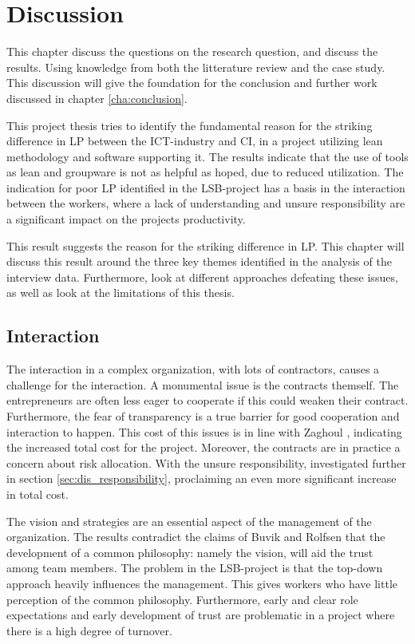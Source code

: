 
\chapter{Discussion} \label{cha:discussion}
This chapter discuss the questions on the research question, and discuss the results. Using knowledge from both the litterature review and the case study. This discussion will give the foundation for the conclusion and further work discussed in chapter \ref{cha:conclusion}. 

This project thesis tries to identify the fundamental reason for the striking difference in LP between the ICT-industry and CI, in a project utilizing lean methodology and software supporting it. The results indicate that the use of tools as lean and groupware is not as helpful as hoped, due to reduced utilization. The indication for poor LP identified in the LSB-project has a basis in the interaction between the workers, where a lack of understanding and unsure responsibility are a significant impact on the projects productivity. 

This result suggests the reason for the striking difference in LP. This chapter will discuss this result around the three key themes identified in the analysis of the interview data. Furthermore, look at different approaches defeating these issues, as well as look at the limitations of this thesis.

\section{Interaction} \label{sec:dis_interaction}
The interaction in a complex organization, with lots of contractors, causes a challenge for the interaction. A monumental issue is the contracts themself. The entrepreneurs are often less eager to cooperate if this could weaken their contract. Furthermore, the fear of transparency is a true barrier for good cooperation and interaction to happen. This cost of this issues is in line with Zaghoul \cite{zaghloul2003construction}, indicating the increased total cost for the project. Moreover, the contracts are in practice a concern about risk allocation. With the unsure responsibility, investigated further in section \ref{sec:dis_responsibility}, proclaiming an even more significant increase in total cost. 

The vision and strategies are an essential aspect of the management of the organization. The results contradict the claims of Buvik and Rolfsen \cite{rolfsen} that the development of a common philosophy: namely the vision, will aid the trust among team members. The problem in the LSB-project is that the top-down approach heavily influences the management. This gives workers who have little perception of the common philosophy. Furthermore, early and clear role expectations and early development of trust are problematic in a project where there is a high degree of turnover. 

